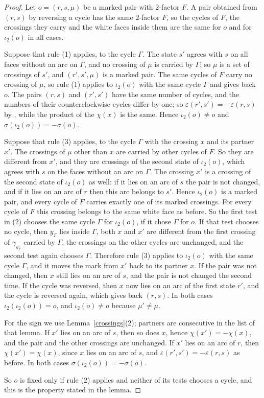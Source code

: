 \documentclass[a4paper]{amsart}
\newcommand{\eps}{\varepsilon}
\begin{document}
\begin{proof}
Let $o=(r,s,\mu)$ be a marked pair with $2$-factor $F$.
A pair obtained from $(r,s)$ by reversing a cycle has the same $2$-factor $F$, so the cycles of $F$, the crossings they carry and the white faces inside them are the same for $o$ and for $\iota_2(o)$ in all cases.

Suppose that rule (1) applies, to the cycle $\Gamma$.
The state $s'$ agrees with $s$ on all faces without an arc on $\Gamma$, and no crossing of $\mu$ is carried by $\Gamma$; so $\mu$ is a set of crossings of $s'$, and $(r',s',\mu)$ is a marked pair.
The same cycles of $F$ carry no crossing of $\mu$, so rule (1) applies to $\iota_2(o)$ with the same cycle $\Gamma$ and gives back $o$.
The pairs $(r,s)$ and $(r',s')$ have the same number of cycles, and the numbers of their counterclockwise cycles differ by one; so $\eps(r',s')=-\eps(r,s)$ by \cite[Lemma~6.2(3)]{P}, while the product of the $\chi(x)$ is the same.
Hence $\iota_2(o)\neq o$ and $\sigma(\iota_2(o))=-\sigma(o)$.

Suppose that rule (3) applies, to the cycle $\Gamma$ with the crossing $x$ and its partner $x'$.
The crossings of $\mu$ other than $x$ are carried by other cycles of $F$.
So they are different from $x'$, and they are crossings of the second state of $\iota_2(o)$, which agrees with $s$ on the faces without an arc on $\Gamma$.
The crossing $x'$ is a crossing of the second state of $\iota_2(o)$ as well: if it lies on an arc of $s$ the pair is not changed, and if it lies on an arc of $r$ then this arc belongs to $s'$.
Hence $\iota_2(o)$ is a marked pair, and every cycle of $F$ carries exactly one of its marked crossings.
For every cycle of $F$ this crossing belongs to the same white face as before.
So the first test in (2) chooses the same cycle $\Gamma$ for $\iota_2(o)$, if it chose $\Gamma$ for $o$.
If that test chooses no cycle, then $y_\Gamma$ lies inside $\Gamma$, both $x$ and $x'$ are different from the first crossing of $\gamma_{y_\Gamma}$ carried by $\Gamma$, the crossings on the other cycles are unchanged, and the second test again chooses $\Gamma$.
Therefore rule (3) applies to $\iota_2(o)$ with the same cycle $\Gamma$, and it moves the mark from $x'$ back to its partner $x$.
If the pair was not changed, then $x$ still lies on an arc of $s$, and the pair is not changed the second time.
If the cycle was reversed, then $x$ now lies on an arc of the first state $r'$, and the cycle is reversed again, which gives back $(r,s)$.
In both cases $\iota_2(\iota_2(o))=o$, and $\iota_2(o)\neq o$ because $\mu'\neq\mu$.

For the sign we use Lemma~\ref{crossings}(2); partners are consecutive in the list of that lemma.
If $x'$ lies on an arc of $s$, then so does $x$, hence $\chi(x')=-\chi(x)$, and the pair and the other crossings are unchanged.
If $x'$ lies on an arc of $r$, then $\chi(x')=\chi(x)$, since $x$ lies on an arc of $s$, and $\eps(r',s')=-\eps(r,s)$ as before.
In both cases $\sigma(\iota_2(o))=-\sigma(o)$.

So $o$ is fixed only if rule (2) applies and neither of its tests chooses a cycle, and this is the property stated in the lemma.
\end{proof}
\end{document}
